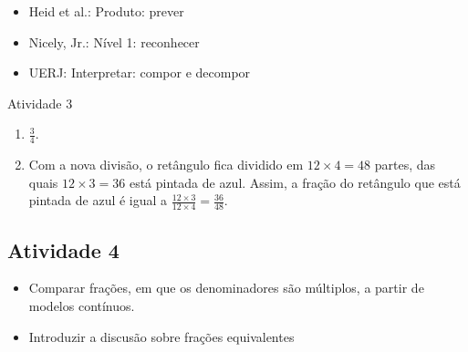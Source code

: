 \begin{multicols}{2}
  
   \vspace{.1cm}
  
 \vspace{.1cm}
  
\begin{itemize} %
    \item       Heid et al.: Produto: prever
    \item       Nicely, Jr.: Nível 1: reconhecer
    \item       UERJ: Interpretar: compor e decompor
\end{itemize} %
  
\begin{resposta*}{Atividade 3}  
\begin{enumerate} [\quad a)] %
    \item             $\frac{3}{4}$.
    \item       Com a nova divisão, o retângulo fica dividido em       $12 
\times 4 = 48$       partes, das quais       $12 \times 3 = 36$       está 
pintada de azul. Assim, a fração do retângulo que está pintada de azul é igual a 
      $\frac{12 \times 3}{12 \times 4} = \frac{36}{48}$.
\end{enumerate} %
  
\end{resposta*}



\subsection{Atividade 4}

\begin{itemize} %
    \item       Comparar frações, em que os denominadores são múltiplos, a 
partir de modelos contínuos.
    \item       Introduzir a discusão sobre frações equivalentes    
\end{itemize} %
  
      
 

\end{multicols}
